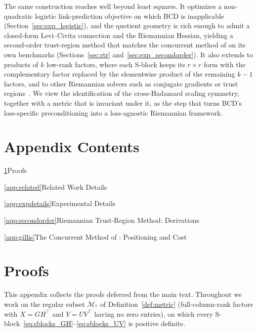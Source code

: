 \documentclass[letterpaper, 10 pt, conference]{ieeeconf}
\newcommand{\cM}{\mathcal{M}}
\theoremstyle{plain}
\theoremstyle{definition}
\theoremstyle{remark}
\begin{document}
The same construction reaches well beyond least squares. It optimizes a non-quadratic logistic link-prediction objective on which BCD is inapplicable (Section~\ref{sec:exp_logistic}), and the quotient geometry is rich enough to admit a closed-form Levi--Civita connection and the Riemannian Hessian, yielding a second-order trust-region method that matches the concurrent method of \citet{gillis2026manifold} on its own benchmarks (Sections~\ref{sec:rtr} and~\ref{sec:exp_secondorder}). It also extends to products of $k$ low-rank factors, where each S-block keeps its $r\times r$ form with the complementary factor replaced by the elementwise product of the remaining $k{-}1$ factors, and to other Riemannian solvers such as conjugate gradients or trust regions~\cite{absilbook, ciaperoni2024hadamard, wertz2024bcd}. We view the identification of the cross-Hadamard scaling symmetry, together with a metric that is invariant under it, as the step that turns BCD's loss-specific preconditioning into a loss-agnostic Riemannian framework.





\clearpage
\useRomanappendicesfalse
\appendices
\section*{Appendix Contents}
{\small
\noindent\ref{app:proofs}\quad Proofs\dotfill\pageref{app:proofs}\par
\noindent\ref{app:related}\quad Related Work Details\dotfill\pageref{app:related}\par
\noindent\ref{app:expdetails}\quad Experimental Details\dotfill\pageref{app:expdetails}\par
\noindent\ref{app:secondorder}\quad Riemannian Trust-Region Method: Derivations\dotfill\pageref{app:secondorder}\par
\noindent\ref{app:gillis}\quad The Concurrent Method of \citet{gillis2026manifold}: Positioning and Cost\dotfill\pageref{app:gillis}\par
}
\bigskip

\section{Proofs}
\label{app:proofs}
This appendix collects the proofs deferred from the main text. Throughout we work on the regular subset $\cM_*$ of Definition~\ref{def:metric} (full-column-rank factors with $X=GH^\top$ and $Y=UV^\top$ having no zero entries), on which every S-block~\eqref{eq:sblocks_GH}--\eqref{eq:sblocks_UV} is positive definite.
\end{document}
